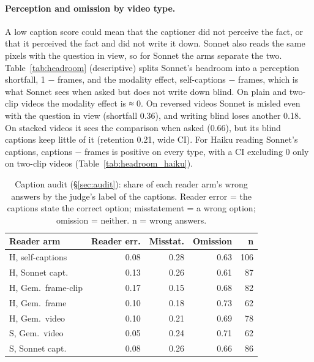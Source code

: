 \documentclass[11pt]{article}
\begin{document}
\paragraph{Perception and omission by video type.} A low caption score could mean that the captioner did not perceive the fact, or that it perceived the fact and did not write it down. Sonnet also reads the same pixels with the question in view, so for Sonnet the arms separate the two. Table~\ref{tab:headroom} (descriptive) splits Sonnet's headroom into a perception shortfall, 1 − frames, and the modality effect, self-captions − frames, which is what Sonnet sees when asked but does not write down blind. On plain and two-clip videos the modality effect is ≈ 0. On reversed videos Sonnet is misled even with the question in view (shortfall 0.36), and writing blind loses another 0.18. On stacked videos it sees the comparison when asked (0.66), but its blind captions keep little of it (retention 0.21, wide CI). For Haiku reading Sonnet's captions, captions − frames is positive on every type, with a CI excluding 0 only on two-clip videos (Table~\ref{tab:headroom_haiku}).

\begin{table}[t]
\centering
\footnotesize
\setlength{\tabcolsep}{3pt}
\begin{tabular}{@{}lrrrr@{}}
\toprule
Reader arm & Reader err. & Misstat. & Omission & n \\
\midrule
H, self-captions & 0.08 & 0.28 & 0.63 & 106 \\
H, Sonnet capt. & 0.13 & 0.26 & 0.61 & 87 \\
H, Gem.\ frame-clip & 0.17 & 0.15 & 0.68 & 82 \\
H, Gem.\ frame & 0.10 & 0.18 & 0.73 & 62 \\
H, Gem.\ video & 0.10 & 0.21 & 0.69 & 78 \\
S, Gem.\ video & 0.05 & 0.24 & 0.71 & 62 \\
S, Sonnet capt. & 0.08 & 0.26 & 0.66 & 86 \\
\bottomrule
\end{tabular}
\caption{Caption audit (\S\ref{sec:audit}): share of each reader arm's wrong answers by the judge's label of the captions. Reader error = the captions state the correct option; misstatement = a wrong option; omission = neither. n = wrong answers.}
\label{tab:audit}
\end{table}
\end{document}
